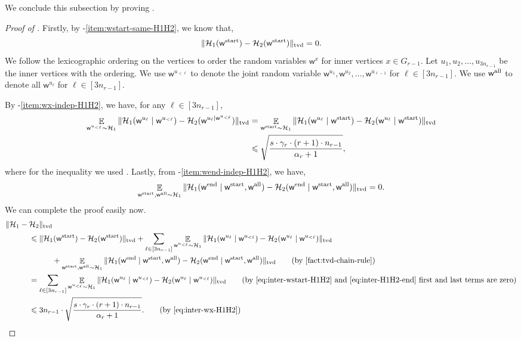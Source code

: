 \documentclass[11pt]{article}
\theoremstyle{definition}
\renewcommand{\leq}{\leqslant}
\newcommand{\tvd}[2]{\ensuremath{\norm{#1 - #2}_{\mathrm{tvd}}}}
\newcommand{\norm}[1]{\ensuremath{\|#1\|}}
\DeclareMathOperator*{\Exp}{\ensuremath{{\mathbb{E}}}}
\newcommand{\rv}[1]{\ensuremath{{\mathsf{#1}}}\xspace}
\newcommand{\cH}{\ensuremath{\mathcal{H}}}
\newcommand{\rw}{\rv{w}}
\newcommand{\rwstart}{\rv{w}^{\textnormal{start}}}
\newcommand{\rwend}{\rv{w}^{\textnormal{end}}}
\begin{document}
We conclude this subsection by proving .
\begin{proof}[Proof of ]
	Firstly, by -\ref{item:wstart-same-H1H2}, we know that, 
	\begin{equation}\label{eq:inter-wstart-H1H2}
		\tvd{\cH_1(\rwstart)}{\cH_2(\rwstart)} = 0.
	\end{equation}
	We follow the lexicographic ordering on the vertices to order the random variables $\rw^x$ for inner vertices $x \in G_{r-1}$. 
	Let $u_1, u_2, \ldots, u_{3n_{r-1}}$ be the inner vertices with the ordering. We use $\rw^{u_{<\ell}}$ to denote the joint random variable $\rw^{u_1}, \rw^{u_2}, \ldots, \rw^{u_{\ell-1}}$ for $\ell \in [3n_{r-1}]$. We use $\rwall$ to denote all $\rw^{u_{\ell}}$ for $\ell \in [3n_{r-1}]$. 
	
	By -\ref{item:wx-indep-H1H2}, we have, for any $\ell \in [3n_{r-1}]$, 
	\begin{align}\label{eq:inter-wx-H1H2}
		\Exp_{\rw^{u_{< \ell}} \sim \cH_1}\tvd{\cH_1(\rw^{u_{\ell}} \mid \rw^{u_{< \ell}})}{\cH_2(\rw^{u_{\ell} \mid \rw^{u_{< \ell}}})} &= \Exp_{\rwstart \sim \cH_1} \tvd{\cH_1(\rw^{u_{\ell}} \mid \rwstart)}{\cH_2(\rw^{u_{\ell}} \mid \rwstart)} \nonumber\\
		&\leq \sqrt{\frac{s \cdot \gamma_r  \cdot (r+1) \cdot n_{r-1}}{\alpha_r + 1}},
	\end{align}
	where for the inequality we used . Lastly, from -\ref{item:wend-indep-H1H2}, we have, 
	\begin{equation}\label{eq:inter-H1H2-end}
	\Exp_{\rwstart, \rwall \sim \cH_1}	\tvd{\cH_1(\rwend \mid \rwstart,\rwall)}{\cH_2(\rwend \mid  \rwstart, \rwall)}  = 0.
	\end{equation}
	We can complete the proof easily now. 
	\begin{align*}
		&\tvd{\cH_1}{\cH_2} \\
		&\hspace{30pt}\leq \tvd{\cH_1(\rwstart)}{\cH_2(\rwstart)} + \sum_{\ell \in [3n_{r-1}]} \Exp_{\rw^{u_{< \ell}} \sim \cH_1}\tvd{\cH_1(\rw^{u_{\ell}} \mid \rw^{u_{<\ell}})}{\cH_2(\rw^{u_{\ell}} \mid \rw^{u_{< \ell}})} \\
		& \hspace{60pt} + 	\Exp_{\rwstart, \rwall \sim \cH_1}	\tvd{\cH_1(\rwend \mid \rwstart,\rwall)}{\cH_2(\rwend \mid  \rwstart, \rwall)}  \tag{by \Cref{fact:tvd-chain-rule}}\\
		&\hspace{30pt}= \sum_{\ell \in [3n_{r-1}]} \Exp_{\rw^{u_{< \ell}} \sim \cH_1}\tvd{\cH_1(\rw^{u_{\ell}} \mid \rw^{u_{<\ell}})}{\cH_2(\rw^{u_{\ell}} \mid \rw^{u_{< \ell}})} \tag{by \Cref{eq:inter-wstart-H1H2} and \Cref{eq:inter-H1H2-end} first and last terms are zero} \\
		&\hspace{30pt}\leq 3n_{r-1} \cdot  \sqrt{\frac{s \cdot \gamma_r  \cdot (r+1) \cdot n_{r-1}}{\alpha_r + 1}}. \qedhere \tag{by \Cref{eq:inter-wx-H1H2}}
	\end{align*}
\end{proof}
\end{document}
